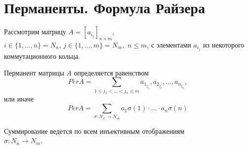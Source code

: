 \section{Перманенты. Формула Райзера}

Рассмотрим матрицу $A=[a_{i_j}]_{n \times m}$, \\ $i\in\{1,\ldots,n\}=N_n$,
 $j \in \{1,\ldots,m\}=N_m,$ $n \leq m$, с элементами $a_{i_j}$ из некоторого коммутационного кольца.

\opr Перманент матрицы $A$ определяется равенством
$$
Per A = \sum_{1\leq j_1<\ldots<j_n\leq m} a_{1_{j_1}}, a_{2_{j_2}}, \ldots, a_{n_{j_n}},
$$
или иначе 
$$
Per A = \sum_{\sigma:N_n \rightarrow N_m} a_1 \sigma(1) \cdot \ldots \cdot a_n \sigma(n)
$$

Суммирование ведется по всем инъективным отображениям \\ $\sigma:N_n \rightarrow N_m$.
\\
\prop
